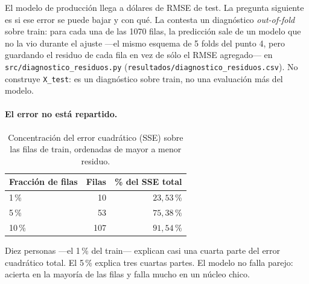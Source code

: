 \documentclass[11pt,a4paper]{article}
\begin{document}
\begin{sloppypar}
El modelo de producción llega a \rmsetestproduccion{} dólares de RMSE de test. La pregunta
siguiente es si ese error se puede bajar y con qué. La contesta un diagnóstico
\emph{out-of-fold} sobre train: para cada una de las 1070 filas, la predicción sale de un
modelo que no la vio durante el ajuste ---el mismo esquema de 5 folds del punto 4, pero
guardando el residuo de cada fila en vez de sólo el RMSE agregado--- en
\texttt{src/diagnostico\_residuos.py} (\texttt{resultados/diagnostico\_residuos.csv}). No
construye \texttt{X\_test}: es un diagnóstico sobre train, no una evaluación más del modelo.
\end{sloppypar}

\paragraph{El error no está repartido.}

\begin{table}[H]
\centering
\caption{Concentración del error cuadrático (SSE) sobre las filas de train, ordenadas de mayor a
menor residuo.}
\begin{tabular}{lrr}
\toprule
\textbf{Fracción de filas} & \textbf{Filas} & \textbf{\% del SSE total} \\
\midrule
1\,\%  & 10  & $23{,}53$\,\% \\
5\,\%  & 53  & $75{,}38$\,\% \\
10\,\% & 107 & $91{,}54$\,\% \\
\bottomrule
\end{tabular}
\end{table}

Diez personas ---el 1\,\% del train--- explican casi una cuarta parte del error cuadrático
total. El 5\,\% explica tres cuartas partes. El modelo no falla parejo: acierta en la mayoría
de las filas y falla mucho en un núcleo chico.
\end{document}
